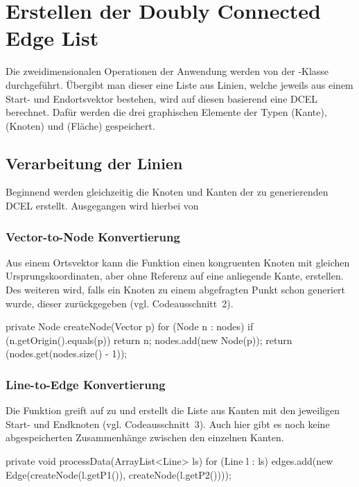 \section{Erstellen der Doubly Connected Edge List}
Die zweidimensionalen Operationen der Anwendung werden von der -Klasse durchgeführt. 
Übergibt man dieser eine Liste aus Linien, welche jeweils aus einem Start- und Endortsvektor bestehen, wird auf diesen basierend eine DCEL berechnet.
Dafür werden die drei graphischen Elemente der Typen  (Kante),  (Knoten) und  (Fläche) gespeichert.

\subsection{Verarbeitung der Linien}
Beginnend werden gleichzeitig die Knoten und Kanten der zu generierenden DCEL erstellt.
Ausgegangen wird hierbei von

\subsubsection{Vector-to-Node Konvertierung}
Aus einem Ortsvektor kann die Funktion  einen kongruenten Knoten mit gleichen Ursprungskoordinaten, aber ohne Referenz auf eine anliegende Kante, erstellen. 
Des weiteren wird, falls ein Knoten zu einem abgefragten Punkt schon generiert wurde, dieser zurückgegeben (vgl. Codeausschnitt~2). \\

\begin{code}
	private Node createNode(Vector p) {
		for (Node n : nodes) {
			if (n.getOrigin().equals(p)) {
				return n;
			}
		}
		nodes.add(new Node(p));
		return (nodes.get(nodes.size() - 1));
	}
\end{code}

\subsubsection{Line-to-Edge Konvertierung}
\label{subsec:ltoe} 
Die  Funktion greift auf  zu und erstellt die Liste aus Kanten mit den jeweiligen Start- und Endknoten (vgl. Codeausschnitt~3).
Auch hier gibt es noch keine abgespeicherten Zusammenhänge zwischen den einzelnen Kanten. \\

\begin{code}
	private void processData(ArrayList<Line> ls) {
		for (Line l : ls) {
			edges.add(new Edge(createNode(l.getP1()), createNode(l.getP2())));
		}
	}
\end{code}


